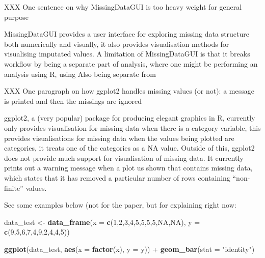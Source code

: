 \documentclass[]{article}
\newenvironment{Shaded}{\begin{snugshade}}{\end{snugshade}}
\newcommand{\KeywordTok}[1]{\textcolor[rgb]{0.13,0.29,0.53}{\textbf{{#1}}}}
\newcommand{\DataTypeTok}[1]{\textcolor[rgb]{0.13,0.29,0.53}{{#1}}}
\newcommand{\DecValTok}[1]{\textcolor[rgb]{0.00,0.00,0.81}{{#1}}}
\newcommand{\StringTok}[1]{\textcolor[rgb]{0.31,0.60,0.02}{{#1}}}
\newcommand{\OtherTok}[1]{\textcolor[rgb]{0.56,0.35,0.01}{{#1}}}
\newcommand{\NormalTok}[1]{{#1}}
\begin{document}
XXX One sentence on why MissingDataGUI is too heavy weight for general
purpose

MissingDataGUI provides a user interface for exploring missing data
structure both numerically and visually, it also provides visualisation
methods for visualising imputated values. A limitation of MissingDataGUI
is that it breaks workflow by being a separate part of analysis, where
one might be performing an analysis using R, using Also being separate
from

XXX One paragraph on how ggplot2 handles missing values (or not): a
message is printed and then the missings are ignored

ggplot2, a (very popular) package for producing elegant graphics in R,
currently only provides visualisation for missing data when there is a
category variable, this provides visualisations for missing data when
the values being plotted are categories, it treats one of the categories
as a NA value. Outside of this, ggplot2 does not provide much support
for visualisation of missing data. It currently prints out a warning
message when a plot us shown that contains missing data, which states
that it has removed a particular number of rows containing
``non-finite'' values.

See some examples below (not for the paper, but for explaining right
now:

\begin{Shaded}
\begin{Highlighting}[]
\NormalTok{data_test <-}\StringTok{ }\KeywordTok{data_frame}\NormalTok{(}\DataTypeTok{x =} \KeywordTok{c}\NormalTok{(}\DecValTok{1}\NormalTok{,}\DecValTok{2}\NormalTok{,}\DecValTok{3}\NormalTok{,}\DecValTok{4}\NormalTok{,}\DecValTok{5}\NormalTok{,}\DecValTok{5}\NormalTok{,}\DecValTok{5}\NormalTok{,}\DecValTok{5}\NormalTok{,}\OtherTok{NA}\NormalTok{,}\OtherTok{NA}\NormalTok{),}
                        \DataTypeTok{y =} \KeywordTok{c}\NormalTok{(}\DecValTok{9}\NormalTok{,}\DecValTok{5}\NormalTok{,}\DecValTok{6}\NormalTok{,}\DecValTok{7}\NormalTok{,}\DecValTok{4}\NormalTok{,}\DecValTok{9}\NormalTok{,}\DecValTok{2}\NormalTok{,}\DecValTok{4}\NormalTok{,}\DecValTok{4}\NormalTok{,}\DecValTok{5}\NormalTok{))}

  \KeywordTok{ggplot}\NormalTok{(data_test,}
         \KeywordTok{aes}\NormalTok{(}\DataTypeTok{x =} \KeywordTok{factor}\NormalTok{(x),}
             \DataTypeTok{y =} \NormalTok{y)) +}\StringTok{ }
\StringTok{  }\KeywordTok{geom_bar}\NormalTok{(}\DataTypeTok{stat =} \StringTok{"identity"}\NormalTok{)}
\end{Highlighting}
\end{Shaded}
\end{document}
